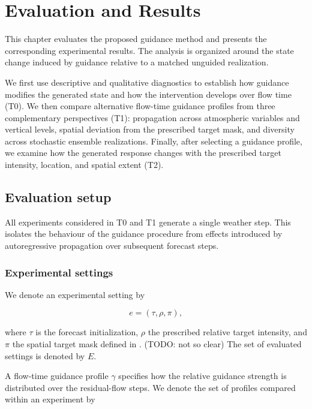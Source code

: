\chapter{Evaluation and Results}
\label{ch:eval}

This chapter evaluates the proposed guidance method and presents the
corresponding experimental results. The analysis is organized around the
state change induced by guidance relative to a matched unguided realization.

We first use descriptive and qualitative diagnostics to establish how guidance
modifies the generated state and how the intervention develops over flow time
(T0). We then compare alternative flow-time guidance profiles from three
complementary perspectives (T1): propagation across atmospheric variables and
vertical levels, spatial deviation from the prescribed target mask, and
diversity across stochastic ensemble realizations. Finally, after selecting a
guidance profile, we examine how the generated response changes with the
prescribed target intensity, location, and spatial extent (T2).


\section{Evaluation setup}
\label{sec:evaluation-setup}

All experiments considered in T0 and T1 generate a single weather step. This
isolates the behaviour of the guidance procedure from effects introduced by
autoregressive propagation over subsequent forecast steps.


\subsection{Experimental settings}
\label{sec:evaluation-settings}

We denote an experimental setting by

\begin{equation}
    e=(\tau,\rho,\pi),
    \label{eq:evaluation-setting}
\end{equation}

where $\tau$ is the forecast initialization, $\rho$ the prescribed relative
target intensity, and $\pi$ the spatial target mask defined in
. (TODO: not so clear) The set of evaluated settings is denoted by $E$.

A flow-time guidance profile $\gamma$ specifies how the relative guidance
strength is distributed over the residual-flow steps. We denote the set of
profiles compared within an experiment by

